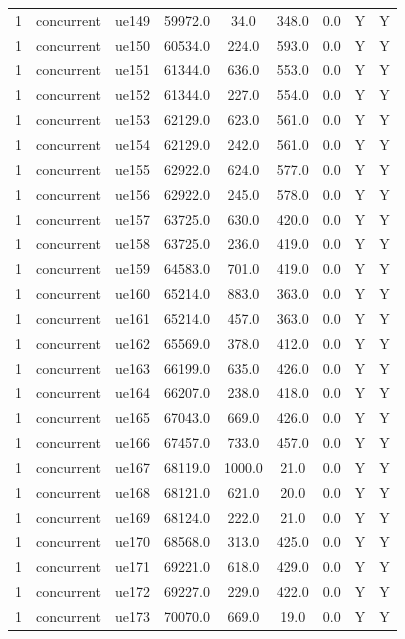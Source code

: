 \begin{table}[ht]
\begin{tabular}{|c|c|c|c|c|c|c|c|c|}
1 & concurrent & ue149 & 59972.0 & 34.0 & 348.0 & 0.0 & Y & Y \\
1 & concurrent & ue150 & 60534.0 & 224.0 & 593.0 & 0.0 & Y & Y \\
1 & concurrent & ue151 & 61344.0 & 636.0 & 553.0 & 0.0 & Y & Y \\
1 & concurrent & ue152 & 61344.0 & 227.0 & 554.0 & 0.0 & Y & Y \\
1 & concurrent & ue153 & 62129.0 & 623.0 & 561.0 & 0.0 & Y & Y \\
1 & concurrent & ue154 & 62129.0 & 242.0 & 561.0 & 0.0 & Y & Y \\
1 & concurrent & ue155 & 62922.0 & 624.0 & 577.0 & 0.0 & Y & Y \\
1 & concurrent & ue156 & 62922.0 & 245.0 & 578.0 & 0.0 & Y & Y \\
1 & concurrent & ue157 & 63725.0 & 630.0 & 420.0 & 0.0 & Y & Y \\
1 & concurrent & ue158 & 63725.0 & 236.0 & 419.0 & 0.0 & Y & Y \\
1 & concurrent & ue159 & 64583.0 & 701.0 & 419.0 & 0.0 & Y & Y \\
1 & concurrent & ue160 & 65214.0 & 883.0 & 363.0 & 0.0 & Y & Y \\
1 & concurrent & ue161 & 65214.0 & 457.0 & 363.0 & 0.0 & Y & Y \\
1 & concurrent & ue162 & 65569.0 & 378.0 & 412.0 & 0.0 & Y & Y \\
1 & concurrent & ue163 & 66199.0 & 635.0 & 426.0 & 0.0 & Y & Y \\
1 & concurrent & ue164 & 66207.0 & 238.0 & 418.0 & 0.0 & Y & Y \\
1 & concurrent & ue165 & 67043.0 & 669.0 & 426.0 & 0.0 & Y & Y \\
1 & concurrent & ue166 & 67457.0 & 733.0 & 457.0 & 0.0 & Y & Y \\
1 & concurrent & ue167 & 68119.0 & 1000.0 & 21.0 & 0.0 & Y & Y \\
1 & concurrent & ue168 & 68121.0 & 621.0 & 20.0 & 0.0 & Y & Y \\
1 & concurrent & ue169 & 68124.0 & 222.0 & 21.0 & 0.0 & Y & Y \\
1 & concurrent & ue170 & 68568.0 & 313.0 & 425.0 & 0.0 & Y & Y \\
1 & concurrent & ue171 & 69221.0 & 618.0 & 429.0 & 0.0 & Y & Y \\
1 & concurrent & ue172 & 69227.0 & 229.0 & 422.0 & 0.0 & Y & Y \\
1 & concurrent & ue173 & 70070.0 & 669.0 & 19.0 & 0.0 & Y & Y \\

\end{tabular}
\end{table}
